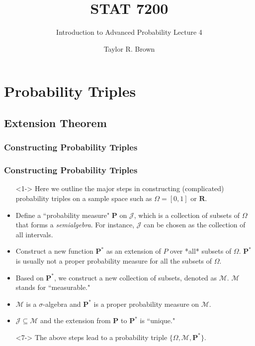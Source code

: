 \documentclass[%
]{beamer}
\title{STAT 7200}
\subtitle{Introduction to Advanced Probability \newline Lecture 4}
\author{Taylor R. Brown}
\institute{}
\date{}
\begin{document}
\frame{\titlepage}

\section[Outline]{}



\section{Probability Triples}

\subsection{Extension Theorem}
\subsubsection{Constructing Probability Triples}

\frame
{
  \frametitle{Constructing Probability Triples}

   \begin{itemize}

      
       \item[] <1->  Here we outline the major steps in constructing (complicated) probability triples on a sample space such as $\Omega=[0,1] \text{ or } \mathbf{R}$.
       
              \item <2->[1)]  Define a ``probability measure" $\mathbf{P}$ on $\mathcal{J}$, which is a collection of subsets of $\Omega$ that forms a \textit{semialgebra}. For instance, $\mathcal{J}$ can be chosen as the collection of all intervals. 
              \item <3-> [2)]   Construct a new function $\mathbf{P}^*$ as an extension of $P$ over *all* subsets of $\Omega$. $\mathbf{P}^*$ is usually not a proper probability measure for all the subsets of $\Omega$.
               \item <4->[3)]    Based on $\mathbf{P}^*$, we construct a new collection of subsets, denoted as $\mathcal{M}$. $\mathcal{M}$ stands for ``measurable."  
               \item <5->[4)]    $\mathcal{M}$ is a $\sigma$-algebra and $\mathbf{P}^*$ is a proper probability measure on $\mathcal{M}$.
                \item <6->[5)]    $\mathcal{J} \subseteq \mathcal{M}$ and the extension from $\mathbf{P}$ to $\mathbf{P}^*$ is ``unique."        
                  \item [] <7-> The above steps lead to a probability triple $\{\Omega, \mathcal{M}, \mathbf{P}^*\}$.     
              
                 \end{itemize}
}
\end{document}
